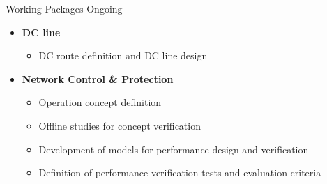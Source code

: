 \begin{frame}{Working Packages Ongoing}
  \begin{itemize}
  \setlength{\itemsep}{0.5em}
  \item \textbf{DC line}
    \begin{itemize}
      \item DC route definition and DC line design

    \end{itemize}

    \item \textbf{Network Control \& Protection}
    \begin{itemize}
      \item Operation concept definition
      \item Offline studies for concept verification
      \item Development of models for performance design and verification
      \item Definition of performance verification tests and evaluation criteria
    \end{itemize}

\end{itemize}
\end{frame}




